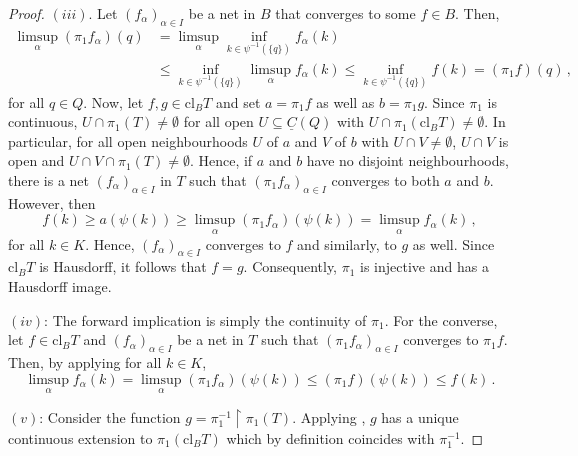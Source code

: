\documentclass[
	paper=A4,
	pagesize=auto,
	fontsize=12pt
]{scrartcl}
\theoremstyle{plain}
\theoremstyle{remark}
\theoremstyle{definition}
\begin{document}
\begin{proof}
$(iii)$.
Let $(f_\alpha)_{\alpha \in I}$ be a net in $B$ that converges to some $f \in B$.
Then,
%
\begin{equation}
\begin{aligned}
\limsup_{\alpha} \left( \pi_1 f_\alpha \right) \left( q \right)
&=
\limsup_{\alpha} \inf_{k \in \psi^{-1} ( \{ q \} )} f_\alpha \left( k \right) \\
&\le
\inf_{k \in \psi^{-1} ( \{ q \} )} \limsup_{\alpha} f_\alpha \left( k \right)
\le
\inf_{k \in \psi^{-1} ( \{ q \} )} f \left( k \right)
=
\left( \pi_1 f \right) \left( q \right) \, ,
\end{aligned}
\end{equation}
%
for all $q \in Q$.
Now, let $f, g \in \mathrm{cl}_B T$ and set $a = \pi_1 f$ as well as $b = \pi_1 g$.
Since $\pi_1$ is continuous, $U \cap \pi_1(T) \neq \emptyset$ for all open $U \subseteq \underline{C}(Q)$ with $U \cap \pi_1(\mathrm{cl}_B T) \neq \emptyset$.
In particular, for all open neighbourhoods $U$ of $a$ and $V$ of $b$ with $U \cap V \neq \emptyset$, $U \cap V$ is open and $U \cap V \cap \pi_1(T) \neq \emptyset$.
Hence, if $a$ and $b$ have no disjoint neighbourhoods, there is a net $(f_\alpha)_{\alpha \in I}$ in $T$ such that $(\pi_1 f_\alpha)_{\alpha \in I}$ converges to both $a$ and $b$.
However, then
%
\begin{equation}
f \left( k \right)
\ge
a \left( \psi(k) \right)
\ge
\limsup_\alpha \left( \pi_1 f_\alpha \right) \left( \psi(k) \right)
=
\limsup_\alpha f_\alpha \left( k \right) \, ,
\end{equation}
%
for all $k \in K$.
Hence, $(f_\alpha)_{\alpha \in I}$ converges to $f$ and similarly, to $g$ as well.
Since $\mathrm{cl}_B T$ is Hausdorff, it follows that $f = g$.
Consequently, $\pi_1$ is injective and has a Hausdorff image.

$(iv)$:
The forward implication is simply the continuity of $\pi_1$.
For the converse, let $f \in \mathrm{cl}_B T$ and $(f_\alpha)_{\alpha \in I}$ be a net in $T$ such that $(\pi_1 f_\alpha)_{\alpha \in I}$ converges to $\pi_1 f$.
Then, by applying  for all $k \in K$,
%
\begin{equation}
\limsup_{\alpha} f_\alpha \left( k \right)
=
\limsup_{\alpha} \left( \pi_1 f_\alpha \right) \left( \psi \left( k \right) \right)
\le
\left( \pi_1 f \right) \left( \psi \left( k \right) \right)
\le
f \left( k \right) \, .
\end{equation}

$(v)$:
Consider the function $g = \pi_1^{-1} \upharpoonright \pi_1(T)$.
Applying \cite[p. 81, Theorem 1]{src:Bourbaki:GeneralTopologyI}, $g$ has a unique continuous extension to $\pi_1(\mathrm{cl}_B T)$ which by definition coincides with $\pi_1^{-1}$.
\end{proof}
\end{document}
